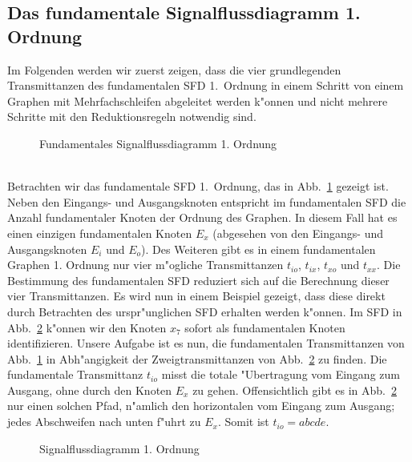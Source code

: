 \subsection{Das fundamentale Signalflussdiagramm 1. Ordnung} Im
Folgenden werden wir zuerst zeigen, dass die vier grundlegenden
Transmittanzen des fundamentalen SFD 1.~Ordnung in einem Schritt von
einem Graphen mit Mehrfachschleifen abgeleitet werden k"onnen und
nicht mehrere Schritte mit den Reduktionsregeln notwendig sind.\\
\begin{figure}[htb!]
\vspace*{-8mm}\begin{center}
  \caption{Fundamentales Signalflussdiagramm 1. Ordnung}\label{SFD27}
\end{center}
\vspace*{-7mm}
\end{figure}~\\
\nit Betrachten wir das fundamentale SFD 1.~Ordnung, das in Abb.~\ref{SFD27} gezeigt
ist. Neben den Eingangs- und Ausgangsknoten entspricht im
fundamentalen SFD die Anzahl fundamentaler Knoten der Ordnung des
Graphen. In diesem Fall hat es einen einzigen fundamentalen Knoten
$E_x$ (abgesehen von den Eingangs- und Ausgangsknoten $E_i$ und
$E_o$).  Des Weiteren gibt es in einem fundamentalen Graphen 1.
Ordnung nur vier m"ogliche Transmittanzen $t_{io}$, $t_{ix}$, $t_{xo}$
und $t_{xx}$. Die Bestimmung des fundamentalen SFD
reduziert sich auf die Berechnung dieser vier
Transmittanzen. Es wird nun in einem Beispiel
gezeigt, dass diese direkt durch Betrachten des urspr"unglichen
SFD erhalten werden k"onnen.
\bsp{}Im SFD in Abb.~\ref{SFD28} k"onnen wir den Knoten $x_7$
sofort als fundamentalen Knoten identifizieren. Unsere Aufgabe ist es
nun, die fundamentalen Transmittanzen von Abb.~\ref{SFD27} in Abh"angigkeit
der Zweigtransmittanzen von Abb.~\ref{SFD28} zu finden.  Die fundamentale
Transmittanz $t_{io}$ misst die totale "Ubertragung vom Eingang zum
Ausgang, ohne durch den Knoten $E_x$ zu gehen. Offensichtlich gibt es
in Abb.~\ref{SFD28} nur einen solchen Pfad, n"amlich den horizontalen vom
Eingang zum Ausgang; jedes Abschweifen nach unten f"uhrt zu $E_x$.
Somit ist $t_{io}=abcde$.\\  
\begin{figure}[htb!]
\begin{center}
  \caption{Signalflussdiagramm 1.
Ordnung}\label{SFD28}
\end{center}
\vspace*{-7mm}
\end{figure}\\
